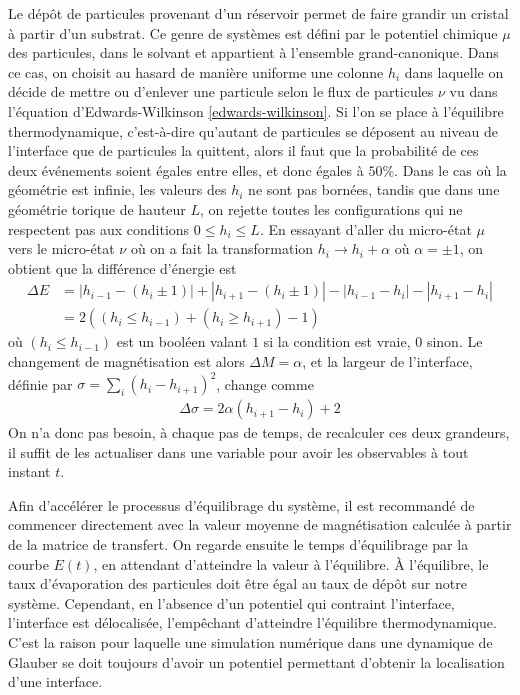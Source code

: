 Le dépôt de particules provenant d'un réservoir permet de faire grandir un cristal à partir d'un substrat. Ce genre de systèmes est défini par le potentiel chimique $\mu$ des particules, dans le solvant et appartient à l'ensemble grand-canonique. Dans ce cas, on choisit au hasard de manière uniforme une colonne $h_i$ dans laquelle on décide de mettre ou d'enlever une particule selon le flux de particules $\nu$ vu dans l'équation d'Edwards-Wilkinson \ref{edwards-wilkinson}. Si l'on se place à l'équilibre thermodynamique, c'est-à-dire qu'autant de particules se déposent au niveau de l'interface que de particules la quittent, alors il faut que la probabilité de ces deux événements soient égales entre elles, et donc égales à $50\%$.
Dans le cas où la géométrie est infinie, les valeurs des $h_i$ ne sont pas bornées, tandis que dans une géométrie torique de hauteur $L$, on rejette toutes les configurations qui ne respectent pas aux conditions $0 \leq h_i \leq L$.
En essayant d'aller du micro-état $\mu$ vers le micro-état $\nu$ où on a fait la transformation $h_i \rightarrow h_i + \alpha$ où $\alpha=\pm 1$, on obtient que la différence d'énergie est
\begin{align}
	\Delta E &= |h_{i-1}-(h_i \pm 1)| + |h_{i+1}-(h_i \pm 1)| - |h_{i-1}-h_i| - |h_{i+1}-h_i|  \\
		&= 2 \left( (h_i \leq h_{i-1}) + (h_i \geq h_{i+1}) -1 \right )
\end{align}
où $(h_i \leq h_{i-1})$ est un booléen valant $1$ si la condition est vraie, $0$ sinon.
Le changement de magnétisation est alors $\Delta M = \alpha$, et la largeur de l'interface, définie par $\sigma = \sum_i (h_i-h_{i+1})^2$, change comme
\begin{align}
	\Delta \sigma = 2 \alpha (h_{i+1}-h_i) + 2
\end{align}
On n'a donc pas besoin, à chaque pas de temps, de recalculer ces deux grandeurs, il suffit de les actualiser dans une variable pour avoir les observables à tout instant $t$.


Afin d'accélérer le processus d'équilibrage du système, il est recommandé de commencer directement avec la valeur moyenne de magnétisation calculée à partir de la matrice de transfert. On regarde ensuite le temps d'équilibrage par la courbe $E(t)$, en attendant d'atteindre la valeur à l'équilibre. 
À l'équilibre, le taux d'évaporation des particules doit être égal au taux de dépôt sur notre système. Cependant, en l'absence d'un potentiel qui contraint l'interface, l'interface est délocalisée, l'empêchant d'atteindre l'équilibre thermodynamique. C'est la raison pour laquelle une simulation numérique dans une dynamique de Glauber se doit toujours d'avoir un potentiel permettant d'obtenir la localisation d'une interface. 

